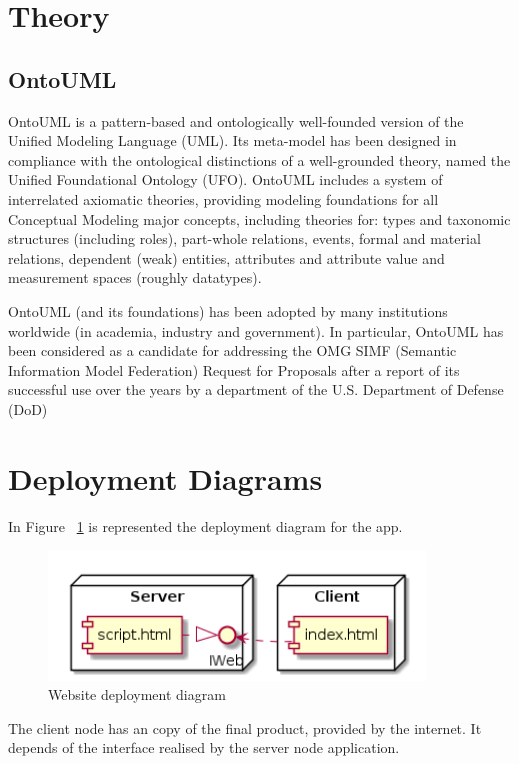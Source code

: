 \documentclass[12pt,a4paper,titlepage]{article}
\begin{document}
\section{Theory}

\subsection{OntoUML}
OntoUML is a pattern-based and ontologically well-founded version of the Unified Modeling Language (UML). Its meta-model has been designed in compliance with the ontological distinctions of a well-grounded theory, named the Unified Foundational Ontology (UFO). OntoUML includes a system of interrelated axiomatic theories, providing modeling foundations for all Conceptual Modeling major concepts, including theories for: types and taxonomic structures (including roles), part-whole relations, events, formal and material relations, dependent (weak) entities, attributes and attribute value and measurement spaces (roughly datatypes). \par

OntoUML (and its foundations) has been adopted by many institutions worldwide (in academia, industry and government). In particular, OntoUML has been considered as a candidate for addressing the OMG SIMF (Semantic Information Model Federation) Request for Proposals after a report of its successful use over the years by a department of the U.S. Department of Defense (DoD)\par
\clearpage

\section{Deployment Diagrams}
In Figure ~\ref{fig:deploy} is represented the deployment diagram for the app.
\begin{figure}[H]
\centering
	\includegraphics[width=10cm]{deploy}
	\caption{Website deployment diagram}
	\label{fig:deploy}
\end{figure}
The client node has an copy of the final product, provided by the internet. It depends of the interface realised by the server node application.
\end{document}

